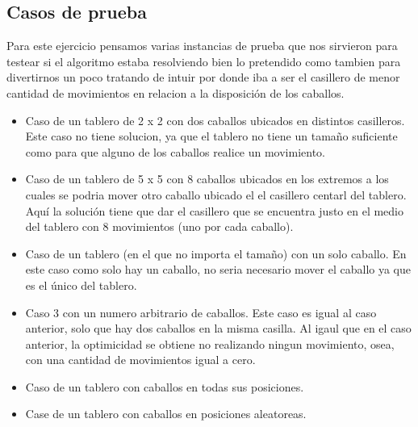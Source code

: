 \subsection{Casos de prueba}

Para este ejercicio pensamos varias instancias de prueba que nos sirvieron para testear si el algoritmo estaba resolviendo bien lo pretendido como tambien para divertirnos un poco tratando de intuir por donde iba a ser el casillero de menor cantidad de movimientos en relacion a la disposici\'on de los caballos.

\begin{itemize}
\item Caso de un tablero de 2 x 2 con dos caballos ubicados en distintos casilleros. Este caso no tiene solucion, ya que el tablero no tiene un tamaño suficiente como para que alguno de los caballos realice un movimiento.
\item Caso de un tablero de 5 x 5 con 8 caballos ubicados en los extremos a los cuales se podria mover otro caballo ubicado el el casillero centarl del tablero. Aquí la solución tiene que dar el casillero que se encuentra justo en el medio del tablero con 8 movimientos (uno por cada caballo).
\item Caso de un tablero (en el que no importa el tamaño) con un solo caballo. En este caso como solo hay un caballo, no seria necesario mover el caballo ya que es el único del tablero.
\item Caso 3 con un numero arbitrario de caballos. Este caso es igual al caso anterior, solo que hay dos caballos en la misma casilla. Al igaul que en el caso anterior, la optimicidad se obtiene no realizando ningun movimiento, osea, con una cantidad de movimientos igual a cero.
\item Caso de un tablero con caballos en todas sus posiciones.
\item Case de un tablero con caballos en posiciones aleatoreas.
\end{itemize}